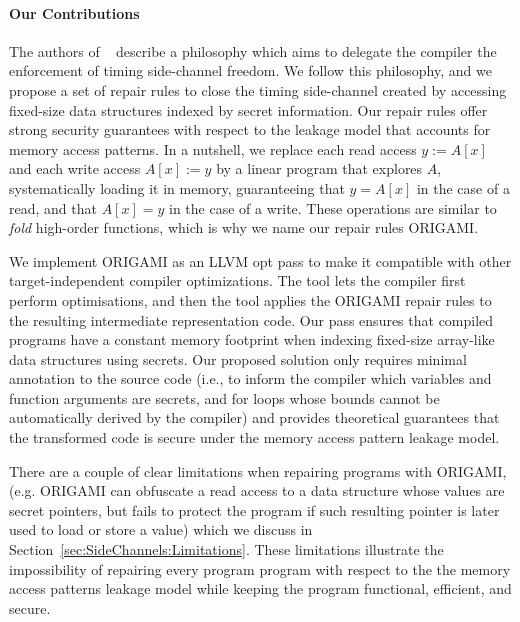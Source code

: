 
\paragraph*{Our Contributions}
The authors of ~\cite{WhatYouCisWhatYouGet} describe a philosophy which aims to delegate the compiler the enforcement of timing side-channel freedom. We follow this philosophy, and we propose a set of repair rules to close the timing side-channel created by accessing fixed-size data structures indexed by secret information. Our repair rules offer strong security guarantees with respect to the leakage model that accounts for memory access patterns. In a nutshell, we replace each read access $y:=A[x]$ and each write access $A[x]:=y$ by a linear program that explores $A$, systematically loading it in memory, guaranteeing that $y=A[x]$ in the case of a read, and that $A[x]=y$ in the case of a write. These operations are similar to \emph{fold} high-order functions, which is why we name our repair rules ORIGAMI.

We implement ORIGAMI as an LLVM opt pass to make it compatible with other target-independent compiler optimizations. The tool lets the compiler first perform optimisations, and then the tool applies the ORIGAMI repair rules to the resulting intermediate representation code. Our pass ensures that compiled programs have a constant memory footprint when indexing fixed-size array-like data structures using secrets. Our proposed solution only requires minimal annotation to the source code (i.e., to inform the compiler which variables and function arguments are secrets, and for loops whose bounds cannot be automatically derived by the compiler) and provides theoretical guarantees that the transformed code is secure under the memory access pattern leakage model. 

There are a couple of clear limitations when repairing programs with ORIGAMI, (e.g. ORIGAMI can obfuscate a read access to a data structure whose values are secret pointers, but fails to protect the program if such resulting pointer is later used to load or store a value) which we discuss in Section~\ref{sec:SideChannels:Limitations}. These limitations illustrate the impossibility of repairing every program program with respect to the the memory access patterns leakage model while keeping the program functional, efficient, and secure. 

